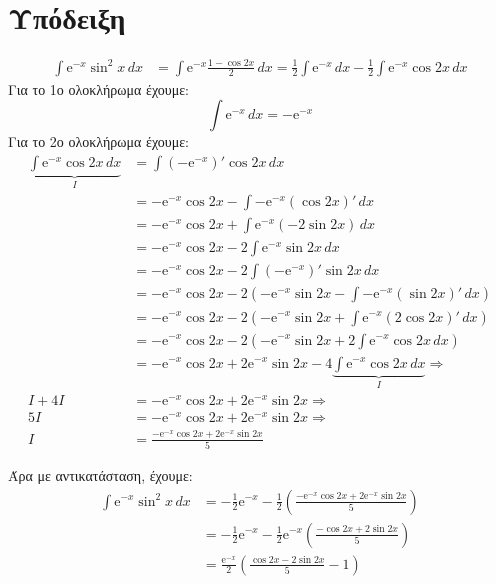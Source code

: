


\everymath{\displaystyle}



\section*{Υπόδειξη}

\begin{align*} 
  \int \mathrm{e}^{-x} \sin^{2}{x} \,{dx} &= \int \mathrm{e}^{-x} \frac{1- \cos{2x}
  }{2}  \,{dx} = \frac{1}{2} \int \mathrm{e}^{-x} \,{dx} - \frac{1}{2} \int 
  \mathrm{e}^{-x} \cos{2x} \,{dx} 
\end{align*}
Για το 1ο ολοκλήρωμα έχουμε:
  \[ \int \mathrm{e}^{-x} \,{dx} = - \mathrm{e}^{-x} \]
Για το 2ο ολοκλήρωμα έχουμε:
\begin{align*} 
  \underbrace{\int \mathrm{e}^{-x} \cos{2x} \, dx}_{I} &= \int (- \mathrm{e}^{-x} )' 
  \cos{2x} \,{dx} \\
  &=  - \mathrm{e}^{-x} \cos{2x} - \int - \mathrm{e}^{-x} (\cos{2x} )' \,{dx} \\
  &= - \mathrm{e}^{-x} \cos{2x} + \int \mathrm{e}^{-x} (-2 \sin{2x}) \,{dx}  \\
  &= - \mathrm{e}^{-x} \cos{2x} -2 \int \mathrm{e}^{-x} \sin{2x} \,{dx}  \\
  &= - \mathrm{e}^{-x} \cos{2x} -2 \int (-\mathrm{e}^{-x})' \sin{2x} \,{dx}  \\
  &= - \mathrm{e}^{-x} \cos{2x} -2 \left( - \mathrm{e}^{-x} \sin{2x} - \int - 
  \mathrm{e}^{-x} (\sin{2x} )' \,{dx}\right) \\
  &= - \mathrm{e}^{-x} \cos{2x} -2 \left( - \mathrm{e}^{-x} \sin{2x} + \int  
  \mathrm{e}^{-x} (2\cos{2x} )' \,{dx}\right) \\
  &= - \mathrm{e}^{-x} \cos{2x} -2 \left( - \mathrm{e}^{-x} \sin{2x} + 2 \int  
  \mathrm{e}^{-x} \cos{2x} \,{dx}\right) \\
  &= - \mathrm{e}^{-x} \cos{2x} + 2 \mathrm{e}^{-x} \sin{2x} -4 
  \underbrace{ \int \mathrm{e}^{-x} \cos{2x} \,{dx}}_{I} \Rightarrow \\
  I + 4I &= - \mathrm{e}^{-x} \cos{2x} + 2 \mathrm{e}^{-x} \sin{2x} \Rightarrow \\
  5I &= - \mathrm{e}^{-x} \cos{2x} + 2 \mathrm{e}^{-x} \sin{2x} \Rightarrow \\
  I &= \frac{- \mathrm{e}^{-x} \cos{2x} + 2 \mathrm{e}^{-x} \sin{2x}}{5} 
\end{align*}

Άρα με αντικατάσταση, έχουμε:
\begin{align*}
  \int \mathrm{e}^{-x} \sin^{2}{x} \,{dx} 
  &= -\frac{1}{2} \mathrm{e}^{-x} - \frac{1}{2} 
  \left(\frac{- \mathrm{e}^{-x} \cos{2x} + 2 \mathrm{e}^{-x} \sin{2x}}{5}\right) \\
  &= -\frac{1}{2} \mathrm{e}^{-x} - \frac{1}{2} \mathrm{e}^{-x} 
  \left(\frac{- \cos{2x} + 2 \sin{2x}}{5}\right) \\
  &= \frac{\mathrm{e}^{-x}}{2} \left( \frac{\cos{2x} - 2 \sin{2x}}{5} - 1\right)
\end{align*}


